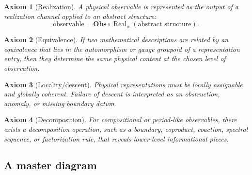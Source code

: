 \documentclass[11pt]{article}
\newtheorem{axiom}{Axiom}[section]
\newcommand{\Obs}{\mathbf{Obs}}
\newcommand{\Real}{\operatorname{Real}}
\begin{document}
\begin{axiom}[Realization]
A physical observable is represented as the output of a realization channel applied to an abstract structure:
\[
\text{observable}=\Obs\circ\Real_\alpha(\text{abstract structure}).
\]
\end{axiom}

\begin{axiom}[Equivalence]
If two mathematical descriptions are related by an equivalence that lies in the automorphism or gauge groupoid of a representation entry, then they determine the same physical content at the chosen level of observation.
\end{axiom}

\begin{axiom}[Locality/descent]
Physical representations must be locally assignable and globally coherent. Failure of descent is interpreted as an obstruction, anomaly, or missing boundary datum.
\end{axiom}

\begin{axiom}[Decomposition]
For compositional or period-like observables, there exists a decomposition operation, such as a boundary, coproduct, coaction, spectral sequence, or factorization rule, that reveals lower-level informational pieces.
\end{axiom}

\subsection{A master diagram}

\begin{center}
\end{center}
\end{document}

